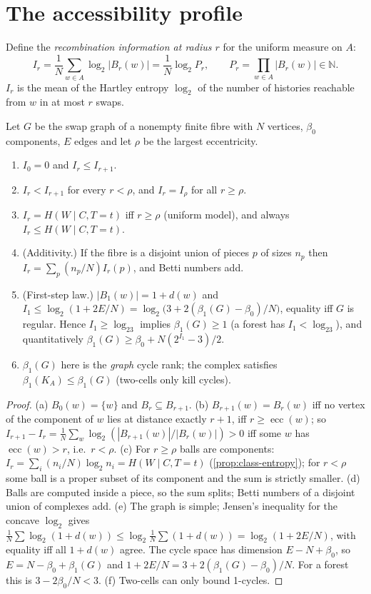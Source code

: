 \section{The accessibility profile}\label{sec:profile}
Define the \emph{recombination information at radius $r$} for the uniform measure on $A$:
\[
I_r=\frac1N\sum_{w\in A}\log_2|B_r(w)|=\frac1N\log_2P_r,\qquad P_r=\prod_{w\in A}|B_r(w)|\in\mathbb N .
\]
$I_r$ is the mean of the Hartley entropy $\log_2$ of the number of histories reachable from $w$ in at most $r$ swaps.
\begin{theorem}\label{thm:profile}
Let $G$ be the swap graph of a nonempty finite fibre with $N$ vertices, $\beta_0$ components, $E$ edges and let $\rho$ be the largest eccentricity.
\begin{enumerate}[label=(\alph*)]
\item $I_0=0$ and $I_r\le I_{r+1}$.
\item $I_r<I_{r+1}$ for every $r<\rho$, and $I_r=I_\rho$ for all $r\ge\rho$.
\item $I_r=H(W\mid C,T=t)$ iff $r\ge\rho$ (uniform model), and always $I_r\le H(W\mid C,T=t)$.
\item (Additivity.) If the fibre is a disjoint union of pieces $p$ of sizes $n_p$ then $I_r=\sum_p(n_p/N)I_r(p)$, and Betti numbers add.
\item (First-step law.) $|B_1(w)|=1+d(w)$ and $I_1\le\log_2(1+2E/N)=\log_2\bigl(3+2(\beta_1(G)-\beta_0)/N\bigr)$, equality iff $G$ is regular. Hence $I_1\ge\log_23$ implies $\beta_1(G)\ge1$ (a forest has $I_1<\log_23$), and quantitatively $\beta_1(G)\ge\beta_0+N(2^{I_1}-3)/2$.
\item $\beta_1(G)$ here is the \emph{graph} cycle rank; the complex satisfies $\beta_1(K_A)\le\beta_1(G)$ (two-cells only kill cycles).
\end{enumerate}
\end{theorem}
\begin{proof}
(a) $B_0(w)=\{w\}$ and $B_r\subseteq B_{r+1}$. (b) $B_{r+1}(w)=B_r(w)$ iff no vertex of the component of $w$ lies at distance exactly $r+1$, iff $r\ge\operatorname{ecc}(w)$; so $I_{r+1}-I_r=\frac1N\sum_w\log_2(|B_{r+1}(w)|/|B_r(w)|)>0$ iff some $w$ has $\operatorname{ecc}(w)>r$, i.e.\ $r<\rho$. (c) For $r\ge\rho$ balls are components: $I_r=\sum_i(n_i/N)\log_2n_i=H(W\mid C,T=t)$ (\cref{prop:class-entropy}); for $r<\rho$ some ball is a proper subset of its component and the sum is strictly smaller. (d) Balls are computed inside a piece, so the sum splits; Betti numbers of a disjoint union of complexes add. (e) The graph is simple; Jensen's inequality for the concave $\log_2$ gives $\frac1N\sum\log_2(1+d(w))\le\log_2\frac1N\sum(1+d(w))=\log_2(1+2E/N)$, with equality iff all $1+d(w)$ agree. The cycle space has dimension $E-N+\beta_0$, so $E=N-\beta_0+\beta_1(G)$ and $1+2E/N=3+2(\beta_1(G)-\beta_0)/N$. For a forest this is $3-2\beta_0/N<3$. (f) Two-cells can only bound 1-cycles.
\end{proof}
